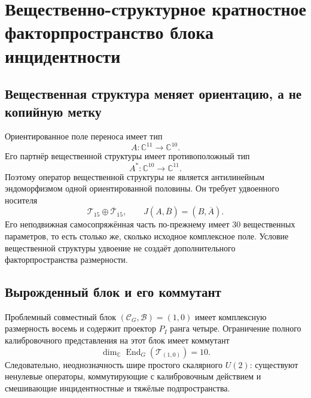 \chapter{Вещественно-структурное кратностное факторпространство блока инцидентности}
\label{ch:v8-real-incidence-multiplicity-quotient-gate}

\section{Вещественная структура меняет ориентацию, а не копийную метку}

Ориентированное поле переноса имеет тип
\begin{equation}
 A:\mathbb C^{11}\longrightarrow\mathbb C^{10}.
 \label{eq:v8-real-oriented-transfer}
\end{equation}
Его партнёр вещественной структуры имеет противоположный тип
\begin{equation}
 A^*:\mathbb C^{10}\longrightarrow\mathbb C^{11}.
 \label{eq:v8-real-opposite-transfer}
\end{equation}
Поэтому оператор вещественной структуры не является антилинейным эндоморфизмом одной
ориентированной половины. Он требует удвоенного носителя
\begin{equation}
 \mathcal T_{15}\oplus\overline{\mathcal T}_{15},
 \qquad
 J(A,\overline B)=(B,\overline A).
 \label{eq:v8-real-transfer-doubling}
\end{equation}
Его неподвижная самосопряжённая часть по-прежнему имеет 30 вещественных
параметров, то есть столько же, сколько исходное комплексное поле. Условие вещественной структуры
удвоение не создаёт дополнительного факторпространства размерности.

\section{Вырожденный блок и его коммутант}

Проблемный совместный блок $(\mathcal C_G,\mathcal B)=(1,0)$ имеет
комплексную размерность восемь и содержит проектор $P_I$ ранга четыре.
Ограничение полного калибровочного представления на этот блок имеет коммутант
\begin{equation}
 \dim_{\mathbb C}\operatorname{End}_G(\mathcal T_{(1,0)})=10.
 \label{eq:v8-real-degenerate-block-commutant}
\end{equation}
Следовательно, неоднозначность шире простого скалярного $U(2)$: существуют
ненулевые операторы, коммутирующие с калибровочным действием и смешивающие инцидентностные и тяжёлые
подпространства.

